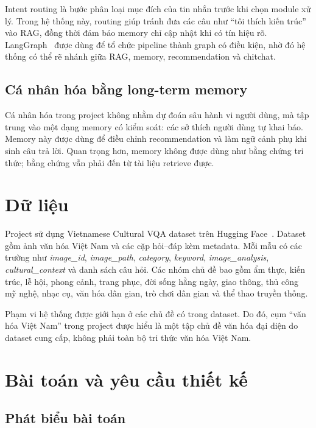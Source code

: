 \documentclass[11pt]{article}
\begin{document}
Intent routing là bước phân loại mục đích của tin nhắn trước khi chọn module xử lý. Trong hệ thống này, routing giúp tránh đưa các câu như ``tôi thích kiến trúc'' vào RAG, đồng thời đảm bảo memory chỉ cập nhật khi có tín hiệu rõ. LangGraph~\citep{langgraph} được dùng để tổ chức pipeline thành graph có điều kiện, nhờ đó hệ thống có thể rẽ nhánh giữa RAG, memory, recommendation và chitchat.

\subsection{Cá nhân hóa bằng long-term memory}

Cá nhân hóa trong project không nhằm dự đoán sâu hành vi người dùng, mà tập trung vào một dạng memory có kiểm soát: các sở thích người dùng tự khai báo. Memory này được dùng để điều chỉnh recommendation và làm ngữ cảnh phụ khi sinh câu trả lời. Quan trọng hơn, memory không được dùng như bằng chứng tri thức; bằng chứng vẫn phải đến từ tài liệu retrieve được.

\section{Dữ liệu}

Project sử dụng Vietnamese Cultural VQA dataset trên Hugging Face~\citep{vietculturalvqa}. Dataset gồm ảnh văn hóa Việt Nam và các cặp hỏi--đáp kèm metadata. Mỗi mẫu có các trường như \textit{image\_id}, \textit{image\_path}, \textit{category}, \textit{keyword}, \textit{image\_analysis}, \textit{cultural\_context} và danh sách câu hỏi. Các nhóm chủ đề bao gồm ẩm thực, kiến trúc, lễ hội, phong cảnh, trang phục, đời sống hằng ngày, giao thông, thủ công mỹ nghệ, nhạc cụ, văn hóa dân gian, trò chơi dân gian và thể thao truyền thống.

Phạm vi hệ thống được giới hạn ở các chủ đề có trong dataset. Do đó, cụm ``văn hóa Việt Nam'' trong project được hiểu là một tập chủ đề văn hóa đại diện do dataset cung cấp, không phải toàn bộ tri thức văn hóa Việt Nam.

\section{Bài toán và yêu cầu thiết kế}

\subsection{Phát biểu bài toán}
\end{document}
